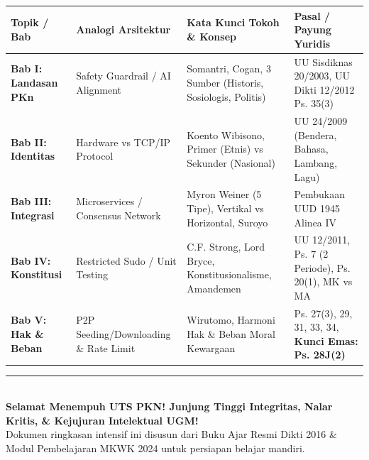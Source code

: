 \documentclass[10pt,a4paper]{article}
\begin{document}
\begin{table}[h!]
\small
\centering
\begin{tabularx}{\textwidth}{p{2.6cm} p{3.4cm} p{3.4cm} Y}
\toprule
\textbf{Topik / Bab} & \textbf{Analogi Arsitektur} & \textbf{Kata Kunci Tokoh \& Konsep} & \textbf{Pasal / Payung Yuridis} \\
\midrule
\textbf{Bab I: Landasan PKn} & Safety Guardrail / AI Alignment & Somantri, Cogan, 3 Sumber (Historis, Sosiologis, Politis) & UU Sisdiknas 20/2003, UU Dikti 12/2012 Ps. 35(3) \\
\addlinespace
\textbf{Bab II: Identitas} & Hardware vs TCP/IP Protocol & Koento Wibisono, Primer (Etnis) vs Sekunder (Nasional) & UU 24/2009 (Bendera, Bahasa, Lambang, Lagu) \\
\addlinespace
\textbf{Bab III: Integrasi} & Microservices / Consensus Network & Myron Weiner (5 Tipe), Vertikal vs Horizontal, Suroyo & Pembukaan UUD 1945 Alinea IV \\
\addlinespace
\textbf{Bab IV: Konstitusi} & Restricted Sudo / Unit Testing & C.F. Strong, Lord Bryce, Konstitusionalisme, Amandemen & UU 12/2011, Ps. 7 (2 Periode), Ps. 20(1), MK vs MA \\
\addlinespace
\textbf{Bab V: Hak \& Beban} & P2P Seeding/Downloading \& Rate Limit & Wirutomo, Harmoni Hak \& Beban Moral Kewargaan & Ps. 27(3), 29, 31, 33, 34, \textbf{Kunci Emas: Ps. 28J(2)} \\
\bottomrule
\end{tabularx}
\end{table}

\vspace{1mm}
\begin{center}
  \rule{0.6\textwidth}{0.4pt}\\[1.5mm]
  {\footnotesize\bfseries\color{ugmblue}Selamat Menempuh UTS PKN! Junjung Tinggi Integritas, Nalar Kritis, \& Kejujuran Intelektual UGM!}\\[0.5mm]
  {\scriptsize\color{gray}Dokumen ringkasan intensif ini disusun dari Buku Ajar Resmi Dikti 2016 \& Modul Pembelajaran MKWK 2024 untuk persiapan belajar mandiri.}
\end{center}
\end{document}
